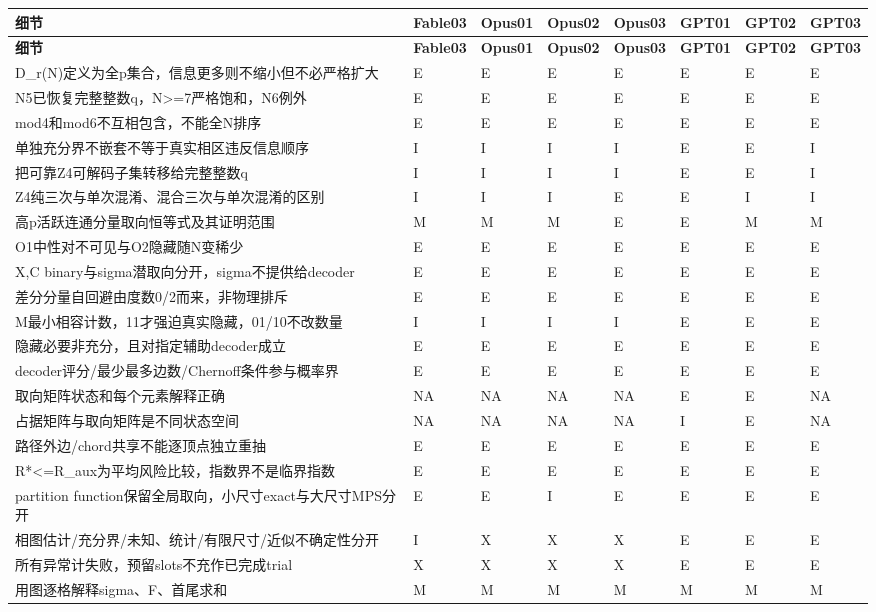 \documentclass[11pt,a4paper]{article}
\renewcommand{\arraystretch}{1.18}
\begin{document}
{\fontsize{8.1}{11}\selectfont
\setlength{\tabcolsep}{2.2pt}
\renewcommand{\arraystretch}{1.05}
\begin{longtable}{>{\raggedright\arraybackslash}p{}>{\raggedright\arraybackslash}p{}>{\raggedright\arraybackslash}p{}>{\raggedright\arraybackslash}p{}>{\raggedright\arraybackslash}p{}>{\raggedright\arraybackslash}p{}>{\raggedright\arraybackslash}p{}>{\raggedright\arraybackslash}p{}}
\toprule
\textbf{细节} & \textbf{Fable03} & \textbf{Opus01} & \textbf{Opus02} & \textbf{Opus03} & \textbf{GPT01} & \textbf{GPT02} & \textbf{GPT03}\tabularnewline
\midrule
\endfirsthead
\toprule
\textbf{细节} & \textbf{Fable03} & \textbf{Opus01} & \textbf{Opus02} & \textbf{Opus03} & \textbf{GPT01} & \textbf{GPT02} & \textbf{GPT03}\tabularnewline
\midrule
\endhead
{}D\_r(N)定义为全p集合，信息更多则不缩小但不必严格扩大 & E & E & E & E & E & E & E\tabularnewline
{}N5已恢复完整整数q，N>=7严格饱和，N6例外 & E & E & E & E & E & E & E\tabularnewline
{}mod4和mod6不互相包含，不能全N排序 & E & E & E & E & E & E & E\tabularnewline
{}单独充分界不嵌套不等于真实相区违反信息顺序 & I & I & I & I & E & E & I\tabularnewline
{}把可靠Z4可解码子集转移给完整整数q & I & I & I & I & E & E & I\tabularnewline
{}Z4纯三次与单次混淆、混合三次与单次混淆的区别 & I & I & I & E & E & I & I\tabularnewline
{}高p活跃连通分量取向恒等式及其证明范围 & M & M & M & E & E & M & M\tabularnewline
{}O1中性对不可见与O2隐藏随N变稀少 & E & E & E & E & E & E & E\tabularnewline
{}X,C binary与sigma潜取向分开，sigma不提供给decoder & E & E & E & E & E & E & E\tabularnewline
{}差分分量自回避由度数0/2而来，非物理排斥 & E & E & E & E & E & E & E\tabularnewline
{}M最小相容计数，11才强迫真实隐藏，01/10不改数量 & I & I & I & I & E & E & E\tabularnewline
{}隐藏必要非充分，且对指定辅助decoder成立 & E & E & E & E & E & E & E\tabularnewline
{}decoder评分/最少最多边数/Chernoff条件参与概率界 & E & E & E & E & E & E & E\tabularnewline
{}取向矩阵状态和每个元素解释正确 & NA & NA & NA & NA & E & E & NA\tabularnewline
{}占据矩阵与取向矩阵是不同状态空间 & NA & NA & NA & NA & I & E & NA\tabularnewline
{}路径外边/chord共享不能逐顶点独立重抽 & E & E & E & E & E & E & E\tabularnewline
{}R*<=R\_aux为平均风险比较，指数界不是临界指数 & E & E & E & E & E & E & E\tabularnewline
{}partition function保留全局取向，小尺寸exact与大尺寸MPS分开 & E & E & I & E & E & E & E\tabularnewline
{}相图估计/充分界/未知、统计/有限尺寸/近似不确定性分开 & I & X & X & X & E & E & E\tabularnewline
{}所有异常计失败，预留slots不充作已完成trial & X & X & X & X & E & E & E\tabularnewline
{}用图逐格解释sigma、F、首尾求和 & M & M & M & M & M & M & M\tabularnewline
\bottomrule
\end{longtable}
}
\end{document}
